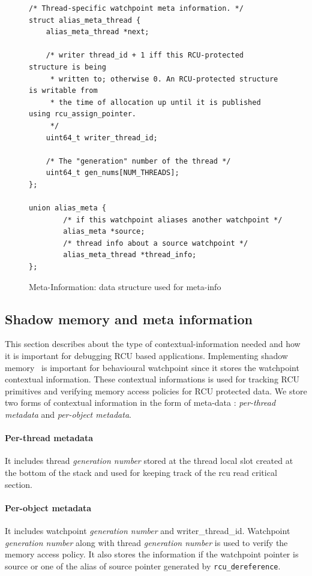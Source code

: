 \begin{figure}[htb]
\begin{lstlisting}
/* Thread-specific watchpoint meta information. */
struct alias_meta_thread {
    alias_meta_thread *next;

    /* writer thread_id + 1 iff this RCU-protected structure is being
     * written to; otherwise 0. An RCU-protected structure is writable from
     * the time of allocation up until it is published using rcu_assign_pointer.
     */
    uint64_t writer_thread_id;

    /* The "generation" number of the thread */
    uint64_t gen_nums[NUM_THREADS];
};

union alias_meta {
        /* if this watchpoint aliases another watchpoint */
        alias_meta *source;
        /* thread info about a source watchpoint */
        alias_meta_thread *thread_info;
}; 
\end{lstlisting}
\caption{Meta-Information: data structure used for meta-info}\label{fig:metainfo}
\end{figure}

\subsection{Shadow memory and meta information}
This section describes about the type of contextual-information needed and how it is important for debugging RCU based applications. Implementing shadow memory~\cite{Memcheck} is important for behavioural watchpoint since it stores the watchpoint contextual information. These contextual informations is used for tracking RCU primitives and verifying memory access policies for RCU protected data. We store two forms of contextual information in the form of meta-data : \emph{per-thread metadata} and \emph{per-object metadata}.
\paragraph{Per-thread metadata} It includes thread \emph{generation number} stored at the thread local slot created at the bottom of the stack and used for keeping track of the rcu read critical section.%
\paragraph{Per-object metadata} It includes watchpoint \emph{generation number} and writer\_thread\_id. Watchpoint \emph{generation number} along with thread \emph{generation number} is used to verify the memory access policy. It also stores the information if the watchpoint pointer is source or one of the alias of source pointer generated by \texttt{rcu\_dereference}. %

